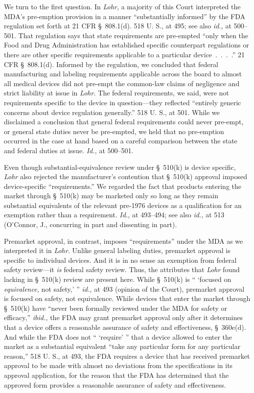{  We turn to the first question. In \emph{Lohr,} a majority of this
Court interpreted the MDA's pre-emption provision in a manner
``substantially informed'' by the FDA regulation set forth at 21 CFR
\S~808.1(d). 518 U. S., at 495; see also \emph{id.,} at 500--501.
That regulation says that state requirements are pre-empted ``only when
the Food and Drug Administration has established specific counterpart
regulations or there are other specific requirements applicable to a
particular device~.~.~.~.'' 21 CFR \S~808.1(d). Informed by
the regulation, we concluded that federal manufacturing and labeling
requirements applicable across the board to almost all medical devices
did not pre-empt the common-law claims of negligence and strict
liability at issue in \emph{Lohr.} The federal requirements, we said, were
not requirements specific to the device in question---they reflected
``entirely generic concerns about device regulation generally.'' 518
U. S., at 501. While we disclaimed a conclusion that general federal
requirements could never pre-empt, or general state duties never be
pre-empted, we held that no pre-emption occurred in the case at hand
based on a careful comparison between the state and federal duties at
issue. \emph{Id.,} at 500--501.

  Even though substantial-equivalence review under \S~510(k) is device
specific, \emph{Lohr} also rejected the manufacturer's contention that
\S~510(k) approval imposed device-specific ``requirements.'' We
regarded the fact that products entering the market through \S~510(k)
may be marketed only so long as they remain substantial equivalents of
the relevant pre-1976 devices as a qualification for an exemption rather
than a requirement. \emph{Id.,} at 493--494; see also \emph{id.,} at 513
(O'Connor, J., concurring in part and dissenting in part).

  Premarket approval, in contrast, imposes ``requirements'' under the
MDA as we interpreted it in \emph{Lohr.} Unlike gen\newpage eral labeling
duties, premarket approval is specific to individual devices. And it
is in no sense an exemption from federal safety review---it \emph{is}
federal safety review. Thus, the attributes that \emph{Lohr} found
lacking in \S~510(k) review are present here. While \S~510(k) is ``
‘focused on \emph{equivalence,} not safety,' '' \emph{id.,} at 493
(opinion of the Court), premarket approval is focused on safety, not
equivalence. While devices that enter the market through \S~510(k)
have ``never been formally reviewed under the MDA for safety or
efficacy,'' \emph{ibid.,} the FDA may grant premarket approval only
after it determines that a device offers a reasonable assurance of
safety and effectiveness, \S~360e(d). And while the FDA does not
`` ‘require' '' that a device allowed to enter the market as a
substantial equivalent ``take any particular form for any particular
reason,'' 518 U. S., at 493, the FDA requires a device that has
received premarket approval to be made with almost no deviations from
the specifications in its approval application, for the reason that
the FDA has determined that the approved form provides a reasonable
assurance of safety and effectiveness.

}
